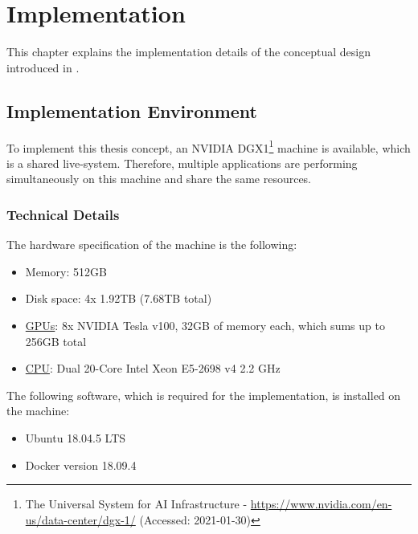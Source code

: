 \chapter{Implementation}
\label{chap:06_implementation}

This chapter explains the implementation details of the conceptual design introduced in .


\section{Implementation Environment}
\label{sec:06_impl-env}
To implement this thesis concept, an NVIDIA DGX1\footnote{The Universal System for AI Infrastructure - \url{https://www.nvidia.com/en-us/data-center/dgx-1/} (Accessed: 2021-01-30)} machine is available, which is a shared live-system. Therefore, multiple applications are performing simultaneously on this machine and share the same resources.


\subsection{Technical Details}
The hardware specification of the machine is the following:
\begin{itemize}
\item Memory: 512GB
\item Disk space: 4x 1.92TB (7.68TB total)
\item \hyperlink{abbr:gpu}{GPUs}: 8x NVIDIA Tesla v100, 32GB of memory each, which sums up to 256GB total
\item \hyperlink{abbr:cpu}{CPU}: Dual 20-Core Intel Xeon E5-2698 v4 2.2 GHz
\end{itemize}


The following software, which is required for the implementation, is installed on the machine:
\begin{itemize}
\item Ubuntu 18.04.5 LTS
\item Docker version 18.09.4
\end{itemize}


